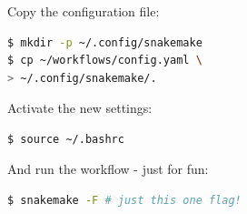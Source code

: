 \begin{frame}[fragile]
	\frametitle{}
	Copy the configuration file:
	\begin{lstlisting}[language=Bash, style=Shell]
$ mkdir -p ~/.config/snakemake
$ cp ~/workflows/config.yaml \
> ~/.config/snakemake/.
	\end{lstlisting}
    Activate the new settings:
    \begin{lstlisting}[language=Bash, style=Shell]
$ source ~/.bashrc
    \end{lstlisting}
    And run the workflow - just for fun:
    \begin{lstlisting}[language=Bash, style=Shell]
$ snakemake -F # just this one flag!
    \end{lstlisting}
\end{frame}

	

